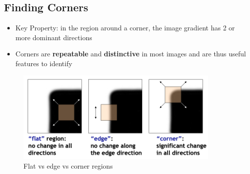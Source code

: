 \documentclass[letterpaper,12pt]{article}
\begin{document}
\subsection{Finding Corners}
\begin{itemize}
 \item Key Property: in the region around a corner, the image gradient has 2 or more dominant directions
 \item Corners are \textbf{repeatable} and \textbf{distinctive} in most images and are thus useful features to identify
\end{itemize}
\begin{figure}
 \centering
 \includegraphics[width=10cm]{images/flat_edge_corner.png}
 \caption{Flat vs edge vs corner regions}
\end{figure}
\end{document}
